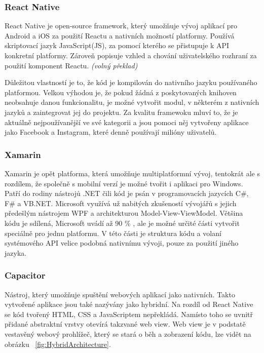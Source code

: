 \documentclass[
  glossaries,
]{kidiplom}
\begin{document}
\subsubsection{React Native}
React Native je open-source framework, který umožňuje vývoj aplikací pro Android a iOS za použití Reactu a nativních možností platformy. Používá skriptovací jazyk JavaScript(JS), za pomocí kterého se přistupuje k API konkretní platformy. Zároveň popisuje vzhled a chování  uživatelského rozhraní za použití komponent Reactu.
\cite{3}
\textit{(volný překlad)}

Důležitou vlastností je to, že kód je kompilován do nativního jazyku používaného platformou. Velkou výhodou je, že pokud žádná z poskytovaných knihoven neobsahuje danou funkcionalitu, je možné vytvořit modul, v některém z nativních jazyků a zaintegrovat jej do projektu. Za kvalitu framewoku mluví to, že je aktuálně nejpoužívanější ve své kategorii a jsou pomoci něj vytvořeny aplikace jako Facebook a Instagram, které denně používají milióny uživatelů.

\subsubsection{Xamarin}
Xamarin je opět platforma, která umožňuje multiplatformní vývoj, tentokrát ale s rozdílem, že společně s mobilní verzí je možné tvořit i aplikaci pro Windows. Patří do rodiny nástrojů .NET čili kód je psán v programovacích jazycích C\#, F\# a VB.NET. Microsoft využívá už nabitých zkušeností vývojářů s jejich předešlým nástrojem WPF a architekturou Model-View-ViewModel. Většina kódu je sdílená, Microsoft uvádí až 90 \% \cite{4}, ale je možné určité části vytvořit speciálně pro jednu platformu. V této části je struktura kódu a volaní systémového API velice podobná nativnímu vývoji, pouze za použití jiného jazyka.

\subsubsection{Capacitor}
Nástroj, který umožňuje spuštění webových aplikací jako nativních. Takto vytvořené aplikace jsou také nazývány jako hybridní. Na rozdíl od React Native se kód tvořený HTML, CSS a JavaScriptem nepřekládá. Namísto toho se uvnitř přidané abstraktní vrstvy otevírá takzvané web view. Web view je v podstatě vestavěný webový prohlížeč, který se stará o běh a zobrazení kódu, lze vidět na obrázku ~\ref{fig:HybridArchitecture}.  
\end{document}
